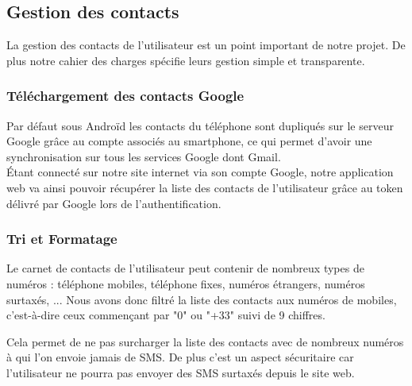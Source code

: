 \subsection{Gestion des contacts}

La gestion des contacts de l'utilisateur est un point important de notre projet.
De plus notre cahier des charges spécifie leurs gestion simple et transparente.
\\


\subsubsection{Téléchargement des contacts Google}
\label{Téléchargement des contacts Google}

Par défaut sous Androïd les contacts du téléphone sont dupliqués sur le serveur Google grâce au compte associés au smartphone, ce qui permet d'avoir une synchronisation sur tous les services Google dont Gmail.
\\


Étant connecté sur notre site internet via son compte Google, notre application web va ainsi pouvoir récupérer la liste des contacts de l'utilisateur grâce au token délivré par Google lors de l'authentification.
\\


\subsubsection{Tri et Formatage}

Le carnet de contacts de l'utilisateur peut contenir de nombreux types de numéros : téléphone mobiles, téléphone fixes, numéros étrangers, numéros surtaxés, ...
Nous avons donc filtré la liste des contacts aux numéros de mobiles, c'est-à-dire ceux commençant par "0" ou "+33" suivi de 9 chiffres.

Cela permet de ne pas surcharger la liste des contacts avec de nombreux numéros à qui l'on envoie jamais de SMS.
De plus c'est un aspect sécuritaire car l'utilisateur ne pourra pas envoyer des SMS surtaxés depuis le site web.
\\


